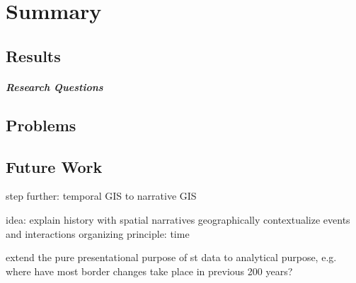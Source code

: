 
\chapter{Summary} %
\label{cha:summary}


\section{Results} %
\label{sec:results}



\paragraph{Research Questions} %
\label{par:result_research_questions}



\section{Problems} %
\label{sec:problems}




\section{Future Work} %
\label{sec:future_work}

step further: temporal GIS to narrative GIS

idea: explain history with spatial narratives
  geographically contextualize events and interactions
  organizing principle: time

extend the pure presentational purpose of st data to analytical purpose, e.g. where have most border changes take place in previous 200 years?




